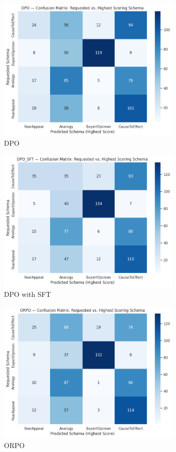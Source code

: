 \documentclass[11pt]{article}
\begin{document}
\begin{figure}[H]
  \centering
  \includegraphics[width=0.8\textwidth]{images/dpo_conf.png}
    \caption{DPO}
\end{figure}
\begin{figure}[H]
  \centering
  \includegraphics[width=0.8\textwidth]{images/dpo_sft_conf.png}
    \caption{DPO with SFT}
\end{figure}
\begin{figure}[H]
  \centering
  \includegraphics[width=0.8\textwidth]{images/orpo_conf.png}
    \caption{ORPO}
\end{figure}
\end{document}

